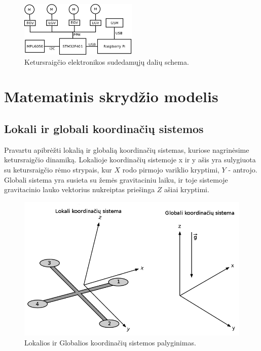 \documentclass[12pt, a4paper, lithuanian, final]{article}
\begin{document}
\begin{figure}[H]
\begin{center}
\includegraphics[width=0.5\textwidth]{img/elektronikosSchema.png}
\caption{Ketursraigčio elektronikos sudedamųjų dalių schema.}
\end{center}
\end{figure}




\section{Matematinis skrydžio modelis}



\subsection{Lokali ir globali koordinačių sistemos}
Pravartu apibrėžti lokalią ir globalią koordinačių sistemas, kuriose nagrinėsime ketursraigčio dinamiką.
Lokalioje koordinačių sistemoje x ir y ašis yra sulygiuota su ketursraigčio rėmo strypais, kur $X$ rodo pirmojo variklio kryptimi, $Y$ - antrojo.
Globali sistema yra susieta su žemės gravitaciniu laiku, ir toje sistemoje gravitacinio lauko vektorius nukreiptas priešinga $Z$ ašiai kryptimi.

\begin{figure}[H]
\begin{center}
\includegraphics[width=1.0\textwidth]{img/Quadcopter_Coordinates.png}
\caption{Lokalios ir Globalios koordinačių sistemos palyginimas.}
\end{center}
\end{figure}
\end{document}
